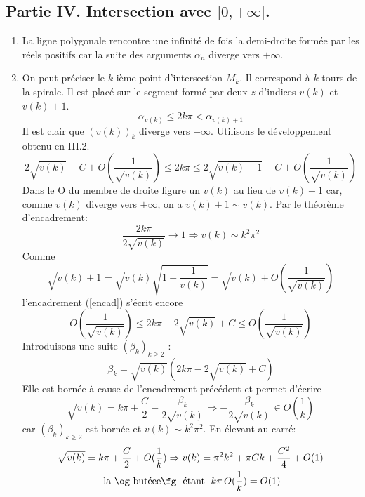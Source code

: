 \subsection*{Partie IV. Intersection avec $]0,+\infty[$.}
\begin{enumerate}
  \item La ligne polygonale rencontre une infinit{\'e} de fois la demi-droite form{\'e}e par les r{\'e}els positifs car la suite des arguments $\alpha_n$ diverge vers $+\infty$.
  \item On peut pr{\'e}ciser le $k$-i{\`e}me point d'intersection $M_k$. Il correspond {\`a} $k$ tours de la spirale. Il est plac{\'e} sur le segment form{\'e} par deux $z$ d'indices $v(k)$ et $v(k)+1$.
\begin{displaymath}
\alpha_{v(k)}\leq 2k \pi < \alpha_{v(k)+1}  
\end{displaymath}
Il est clair que $(v(k))_{k}$ diverge vers $+\infty$.  Utilisons le d{\'e}veloppement obtenu en III.2.
\begin{equation}\label{encad}
  2\sqrt{v(k)}-C+O(\frac{1}{\sqrt{v(k)}})\leq 2k\pi\leq2\sqrt{v(k)+1}-C+O(\frac{1}{\sqrt{v(k)}})
\end{equation}
Dans le O du membre de droite figure un $v(k)$ au lieu de $v(k)+1$ car, comme $v(k)$ diverge vers $+\infty$, on a $v(k)+1\sim v(k)$.\newline
Par le th{\'e}or{\`e}me d'encadrement:
\begin{displaymath}
\frac{2k\pi}{2\sqrt{v(k)}}\rightarrow 1 \Rightarrow v(k)\sim k^2\pi^2  
\end{displaymath}
Comme 
\begin{displaymath}
\sqrt{v(k)+1} = \sqrt{v(k)}\sqrt{1+\frac{1}{v(k)}}=\sqrt{v(k)} + O(\frac{1}{\sqrt{v(k)}})  
\end{displaymath}
l'encadrement (\ref{encad}) s'{\'e}crit encore
\begin{displaymath}
O(\frac{1}{\sqrt{v(k)}})\leq 2k\pi-2\sqrt{v(k)}+C\leq O(\frac{1}{\sqrt{v(k)}})  
\end{displaymath}
Introduisons une suite $\left( \beta_k\right)_{k\geq 2}$ :
\begin{displaymath}
\beta_k =  \sqrt{v(k)}\left( 2k\pi-2\sqrt{v(k)}+C\right) 
\end{displaymath}
Elle est bornée à cause de l'encadrement précédent et permet d'écrire
\begin{displaymath}
\sqrt{v(k)} = k\pi + \frac{C}{2} - \frac{\beta_k}{2\sqrt{v(k)}}   
\Rightarrow - \frac{\beta_k}{2\sqrt{v(k)}} \in O(\frac{1}{k})
\end{displaymath}
car $\left( \beta_k\right)_{k\geq 2}$ est bornée et $v(k)\sim k^2\pi^2$. En élevant au carré: 
\begin{multline*}
\sqrt{v(k)} = k\pi + \frac{C}{2} + O(\frac{1}{k})   
\Rightarrow   v(k) = \pi^2 k^2 + \pi C k + \frac{C^2}{4} + O(1)
\\ \text{ la \og butéee\fg~ étant }\; k\pi\,O(\frac{1}{k}) = O(1)
\end{multline*}
\end{enumerate}
